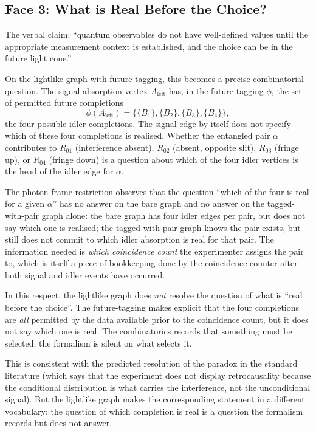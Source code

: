 \documentclass[11pt]{article}
\begin{document}
\subsection{Face 3: What is Real Before the Choice?}

The verbal claim: ``quantum observables do not have well-defined values until the appropriate measurement context is established, and the choice can be in the future light cone.''

On the lightlike graph with future tagging, this becomes a precise combinatorial question. The signal absorption vertex $A_{\text{left}}$ has, in the future-tagging $\phi$, the set of permitted future completions
\[
\phi(A_{\text{left}}) = \bigl\{\{B_1\}, \{B_2\}, \{B_3\}, \{B_4\}\bigr\},
\]
the four possible idler completions. The signal edge by itself does not specify which of these four completions is realised. Whether the entangled pair $\alpha$ contributes to $R_{01}$ (interference absent), $R_{02}$ (absent, opposite slit), $R_{03}$ (fringe up), or $R_{04}$ (fringe down) is a question about which of the four idler vertices is the head of the idler edge for $\alpha$.

The photon-frame restriction observes that the question ``which of the four is real for a given $\alpha$'' has no answer on the bare graph and no answer on the tagged-with-pair graph alone: the bare graph has four idler edges per pair, but does not say which one is realised; the tagged-with-pair graph knows the pair exists, but still does not commit to which idler absorption is real for that pair. The information needed is \emph{which coincidence count} the experimenter assigns the pair to, which is itself a piece of bookkeeping done by the coincidence counter after both signal and idler events have occurred.

In this respect, the lightlike graph does \emph{not} resolve the question of what is ``real before the choice''. The future-tagging makes explicit that the four completions are \emph{all} permitted by the data available prior to the coincidence count, but it does not say which one is real. The combinatorics records that something must be selected; the formalism is silent on what selects it.

This is consistent with the predicted resolution of the paradox in the standard literature (which says that the experiment does not display retrocausality because the conditional distribution is what carries the interference, not the unconditional signal). But the lightlike graph makes the corresponding statement in a different vocabulary: the question of which completion is real is a question the formalism records but does not answer.
\end{document}
